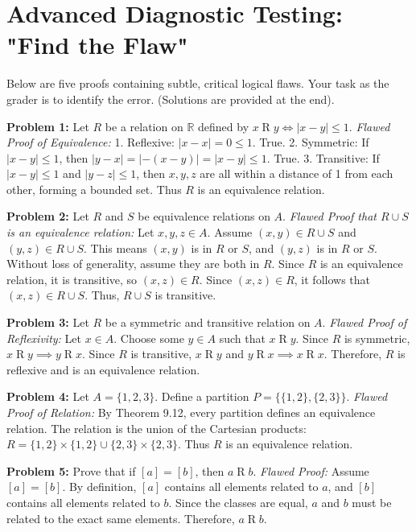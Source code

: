 \documentclass[11pt, a4paper]{article}
\theoremstyle{definition}
\theoremstyle{remark}
\newcommand{\R}{\mathbb{R}}
\begin{document}
\section{Advanced Diagnostic Testing: "Find the Flaw"}

Below are five proofs containing subtle, critical logical flaws. Your task as the grader is to identify the error. (Solutions are provided at the end).

\textbf{Problem 1:} Let $R$ be a relation on $\R$ defined by $x \mathrel{R} y \iff |x - y| \le 1$. 
\textit{Flawed Proof of Equivalence:} 
1. Reflexive: $|x - x| = 0 \le 1$. True.
2. Symmetric: If $|x - y| \le 1$, then $|y - x| = |-(x - y)| = |x - y| \le 1$. True.
3. Transitive: If $|x - y| \le 1$ and $|y - z| \le 1$, then $x, y, z$ are all within a distance of 1 from each other, forming a bounded set. Thus $R$ is an equivalence relation.

\textbf{Problem 2:} Let $R$ and $S$ be equivalence relations on $A$. 
\textit{Flawed Proof that $R \cup S$ is an equivalence relation:}
Let $x, y, z \in A$. Assume $(x,y) \in R \cup S$ and $(y,z) \in R \cup S$. This means $(x,y)$ is in $R$ or $S$, and $(y,z)$ is in $R$ or $S$. Without loss of generality, assume they are both in $R$. Since $R$ is an equivalence relation, it is transitive, so $(x,z) \in R$. Since $(x,z) \in R$, it follows that $(x,z) \in R \cup S$. Thus, $R \cup S$ is transitive.

\textbf{Problem 3:} Let $R$ be a symmetric and transitive relation on $A$.
\textit{Flawed Proof of Reflexivity:}
Let $x \in A$. Choose some $y \in A$ such that $x \mathrel{R} y$. Since $R$ is symmetric, $x \mathrel{R} y \implies y \mathrel{R} x$. Since $R$ is transitive, $x \mathrel{R} y$ and $y \mathrel{R} x \implies x \mathrel{R} x$. Therefore, $R$ is reflexive and is an equivalence relation.

\textbf{Problem 4:} Let $A = \{1, 2, 3\}$. Define a partition $P = \{ \{1, 2\}, \{2, 3\} \}$.
\textit{Flawed Proof of Relation:}
By Theorem 9.12, every partition defines an equivalence relation. The relation is the union of the Cartesian products: $R = \{1,2\} \times \{1,2\} \cup \{2,3\} \times \{2,3\}$. Thus $R$ is an equivalence relation.

\textbf{Problem 5:} Prove that if $[a] = [b]$, then $a \mathrel{R} b$.
\textit{Flawed Proof:}
Assume $[a] = [b]$. By definition, $[a]$ contains all elements related to $a$, and $[b]$ contains all elements related to $b$. Since the classes are equal, $a$ and $b$ must be related to the exact same elements. Therefore, $a \mathrel{R} b$.
\end{document}
